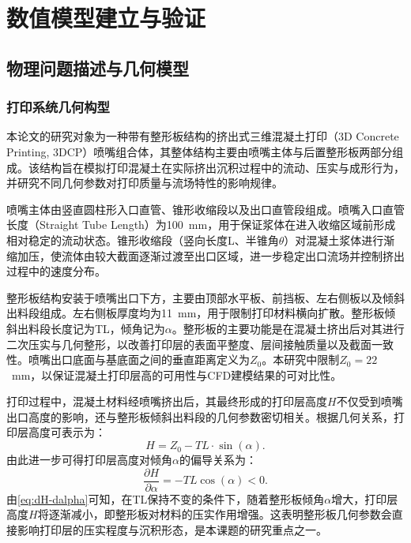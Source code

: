 \chapter{数值模型建立与验证}\label{chap:model}

\section{物理问题描述与几何模型}

\subsection{打印系统几何构型}

本论文的研究对象为一种带有整形板结构的挤出式三维混凝土打印（3D Concrete Printing, 3DCP）喷嘴组合体，其整体结构主要由喷嘴主体与后置整形板两部分组成。该结构旨在模拟打印混凝土在实际挤出沉积过程中的流动、压实与成形行为，并研究不同几何参数对打印质量与流场特性的影响规律。

喷嘴主体由竖直圆柱形入口直管、锥形收缩段以及出口直管段组成。喷嘴入口直管长度（Straight Tube Length）为100~mm，用于保证浆体在进入收缩区域前形成相对稳定的流动状态。锥形收缩段（竖向长度L、半锥角$\theta$）对混凝土浆体进行渐缩加压，使流体由较大截面逐渐过渡至出口区域，进一步稳定出口流场并控制挤出过程中的速度分布。

整形板结构安装于喷嘴出口下方，主要由顶部水平板、前挡板、左右侧板以及倾斜出料段组成。左右侧板厚度均为11~mm，用于限制打印材料横向扩散。整形板倾斜出料段长度记为TL，倾角记为$\alpha$。整形板的主要功能是在混凝土挤出后对其进行二次压实与几何整形，以改善打印层的表面平整度、层间接触质量以及截面一致性。喷嘴出口底面与基底面之间的垂直距离定义为$Z_0$。本研究中限制$Z_0 = 22$~mm，以保证混凝土打印层高的可用性与CFD建模结果的可对比性。

打印过程中，混凝土材料经喷嘴挤出后，其最终形成的打印层高度$H$不仅受到喷嘴出口高度的影响，还与整形板倾斜出料段的几何参数密切相关。根据几何关系，打印层高度可表示为：
\begin{equation}\label{eq:H}
  H = Z_0 - TL \cdot \sin(\alpha).
\end{equation}
由此进一步可得打印层高度对倾角$\alpha$的偏导关系为：
\begin{equation}\label{eq:dH-dalpha}
  \frac{\partial H}{\partial \alpha} = -TL \cos(\alpha) < 0.
\end{equation}
由\cref{eq:dH-dalpha}可知，在TL保持不变的条件下，随着整形板倾角$\alpha$增大，打印层高度$H$将逐渐减小，即整形板对材料的压实作用增强。这表明整形板几何参数会直接影响打印层的压实程度与沉积形态，是本课题的研究重点之一。

